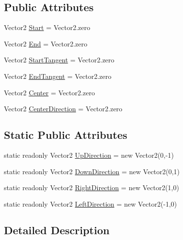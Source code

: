 \subsection*{Public Attributes}
\begin{DoxyCompactItemize}
\item 
Vector2 \hyperlink{classi_c_s___binding_params_af5f5d4614da797cf504d6e055533661b}{Start} = Vector2.\+zero
\item 
Vector2 \hyperlink{classi_c_s___binding_params_a5feaf7ce6486eb7ea0b4f49000b76ae4}{End} = Vector2.\+zero
\item 
Vector2 \hyperlink{classi_c_s___binding_params_ace424b62e2696361c73710aa71580aaf}{Start\+Tangent} = Vector2.\+zero
\item 
Vector2 \hyperlink{classi_c_s___binding_params_a7f8cb9188086e21863bf5016c33c13dc}{End\+Tangent} = Vector2.\+zero
\item 
Vector2 \hyperlink{classi_c_s___binding_params_ac16427404ded431ca3232465c22f8eb0}{Center} = Vector2.\+zero
\item 
Vector2 \hyperlink{classi_c_s___binding_params_ac9c70ab3dec6e0542e4df8043d813451}{Center\+Direction} = Vector2.\+zero
\end{DoxyCompactItemize}
\subsection*{Static Public Attributes}
\begin{DoxyCompactItemize}
\item 
static readonly Vector2 \hyperlink{classi_c_s___binding_params_a2d3bd58f85f2b0663e6c19b454ec63ca}{Up\+Direction} = new Vector2(0,-\/1)
\item 
static readonly Vector2 \hyperlink{classi_c_s___binding_params_a6c93711d002e26f0ad98c251f13094e2}{Down\+Direction} = new Vector2(0,1)
\item 
static readonly Vector2 \hyperlink{classi_c_s___binding_params_ad39efe83d365fcebb1447e37513a5ba7}{Right\+Direction} = new Vector2(1,0)
\item 
static readonly Vector2 \hyperlink{classi_c_s___binding_params_afbcc828dd861afeef1f1347894b81b90}{Left\+Direction} = new Vector2(-\/1,0)
\end{DoxyCompactItemize}


\subsection{Detailed Description}


